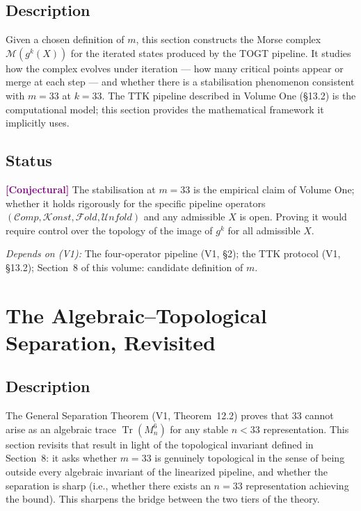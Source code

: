 \documentclass[11pt]{article}
\newcommand{\conjectural}{\textcolor{purple}{\textbf{[Conjectural]}}}
\newcommand{\depends}[1]{\smallskip\noindent\textit{Depends on (V1):} #1.\smallskip}
\newcommand{\Comp}{\mathcal{C}\!omp}
\newcommand{\Konst}{\mathcal{K}\!onst}
\newcommand{\Fold}{\mathcal{F}\!old}
\newcommand{\Unfold}{\mathcal{U}\!nfold}
\begin{document}
\subsection*{Description}
Given a chosen definition of $m$, this section constructs the Morse complex
$\mathcal{M}(g^k(X))$ for the iterated states produced by the TOGT
pipeline. It studies how the complex evolves under iteration --- how many
critical points appear or merge at each step --- and whether there is a
stabilisation phenomenon consistent with $m = 33$ at $k = 33$. The TTK
pipeline described in Volume One (\S13.2) is the computational model;
this section provides the mathematical framework it implicitly uses.

\subsection*{Status}
\conjectural{} The stabilisation at $m = 33$ is the empirical claim of
Volume One; whether it holds rigorously for the specific pipeline operators
$(\Comp, \Konst, \Fold, \Unfold)$ and any admissible $X$ is open. Proving
it would require control over the topology of the image of $g^k$ for all
admissible $X$.

\depends{The four-operator pipeline (V1, \S2);
the TTK protocol (V1, \S13.2);
Section~8 of this volume: candidate definition of $m$}

\section{The Algebraic--Topological Separation, Revisited}

\subsection*{Description}
The General Separation Theorem (V1, Theorem~12.2) proves that $33$ cannot
arise as an algebraic trace $\operatorname{Tr}(M_n^6)$ for any stable
$n < 33$ representation. This section revisits that result in light of the
topological invariant defined in Section~8: it asks whether $m = 33$ is
genuinely topological in the sense of being outside every algebraic
invariant of the linearized pipeline, and whether the separation is sharp
(i.e., whether there exists an $n = 33$ representation achieving the
bound). This sharpens the bridge between the two tiers of the theory.
\end{document}
